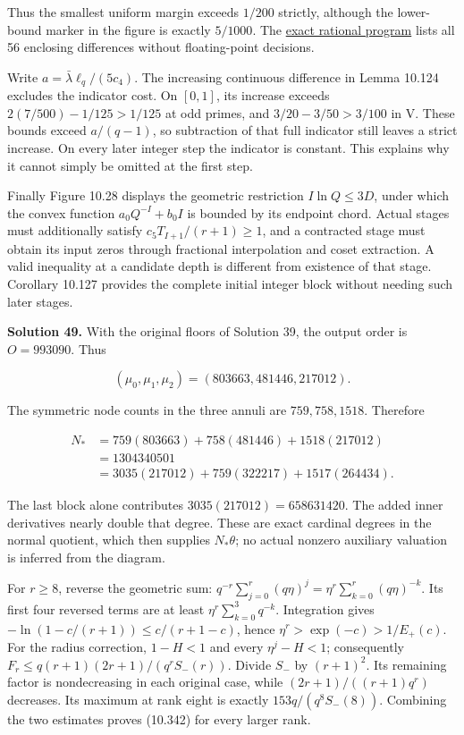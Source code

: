 \documentclass[
  11pt,
  a4paper,
]{article}
\begin{document}
Thus the smallest uniform margin exceeds \(1/200\) strictly, although
the lower-bound marker in the figure is exactly \(5/1000\). The
\href{../figure_sources/integer_comparison_bounds.py}{exact rational
program} lists all 56 enclosing differences without floating-point
decisions.

Write \(a=\bar\lambda\ell_q/(5c_4)\). The increasing continuous
difference in Lemma 10.124 excludes the indicator cost. On \([0,1]\),
its increase exceeds \(2(7/500)-1/125>1/125\) at odd primes, and
\(3/20-3/50>3/100\) in V. These bounds exceed \(a/(q-1)\), so
subtraction of that full indicator still leaves a strict increase. On
every later integer step the indicator is constant. This explains why it
cannot simply be omitted at the first step.

Finally Figure 10.28 displays the geometric restriction \(I\ln Q\le3D\),
under which the convex function \(a_0Q^{-I}+b_0I\) is bounded by its
endpoint chord. Actual stages must additionally satisfy
\(c_5T_{I+1}/(r+1)\ge1\), and a contracted stage must obtain its input
zeros through fractional interpolation and coset extraction. A valid
inequality at a candidate depth is different from existence of that
stage. Corollary 10.127 provides the complete initial integer block
without needing such later stages.

\textbf{Solution 49.} With the original floors of Solution 39, the
output order is \(O=993090\). Thus

\[
(\mu_0,\mu_1,\mu_2)=(803663,481446,217012).
\]

The symmetric node counts in the three annuli are \(759,758,1518\).
Therefore

\[
\begin{aligned}
N_*&=759(803663)+758(481446)+1518(217012)\\
&=1304340501\\
&=3035(217012)+759(322217)+1517(264434).
\end{aligned}
\]

The last block alone contributes \(3035(217012)=658631420\). The added
inner derivatives nearly double that degree. These are exact cardinal
degrees in the normal quotient, which then supplies \(N_*\theta\); no
actual nonzero auxiliary valuation is inferred from the diagram.

For \(r\ge8\), reverse the geometric sum:
\(q^{-r}\sum_{j=0}^r(q\eta)^j=\eta^r\sum_{k=0}^r(q\eta)^{-k}\). Its
first four reversed terms are at least \(\eta^r\sum_{k=0}^3q^{-k}\).
Integration gives \(-\ln(1-c/(r+1))\le c/(r+1-c)\), hence
\(\eta^r>\exp(-c)>1/E_+(c)\). For the radius correction, \(1-H<1\) and
every \(\eta^j-H<1\); consequently \(F_r\le q(r+1)(2r+1)/(q^rS_-(r))\).
Divide \(S_-\) by \((r+1)^2\). Its remaining factor is nondecreasing in
each original case, while \((2r+1)/((r+1)q^r)\) decreases. Its maximum
at rank eight is exactly \(153q/(q^8S_-(8))\). Combining the two
estimates proves (10.342) for every larger rank.
\end{document}
